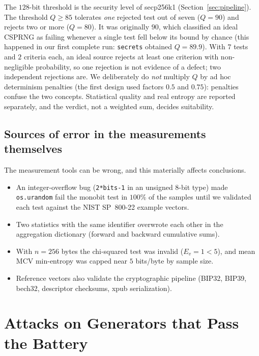 \documentclass[11pt,a4paper]{article}
\theoremstyle{plain}
\theoremstyle{definition}
\begin{document}
The $128$-bit threshold is the security level of secp256k1 (Section~\ref{sec:pipeline}).
The threshold $Q\ge85$ tolerates \emph{one} rejected test out of seven ($Q=90$)
and rejects two or more ($Q=80$). It was originally $90$, which classified an
ideal CSPRNG as failing whenever a single test fell below its bound by chance
(this happened in our first complete run: \texttt{secrets} obtained $Q=89.9$).
With $7$ tests and $2$ criteria each, an ideal source rejects at least one
criterion with non-negligible probability, so one rejection is not evidence of
a defect; two independent rejections are.
We deliberately do \emph{not} multiply $Q$ by ad hoc determinism penalties
(the first design used factors $0.5$ and $0.75$): penalties confuse the two
concepts. Statistical quality and real entropy are reported separately, and the
verdict, not a weighted sum, decides suitability.

\subsection{Sources of error in the measurements themselves}

The measurement tools can be wrong, and this materially affects conclusions.
\begin{itemize}[leftmargin=1.4em]
    \item An integer-overflow bug (\texttt{2*bits-1} in an unsigned 8-bit type)
          made \texttt{os.urandom} fail the monobit test in $100\%$ of the samples
          until we validated each test against the NIST SP~800-22 example
          vectors.
    \item Two statistics with the same identifier overwrote each other in the
          aggregation dictionary (forward and backward cumulative sums).
    \item With $n=256$ bytes the chi-squared test was invalid ($E_v=1<5$), and
          mean MCV min-entropy was capped near $5$ bits/byte by sample size.
    \item Reference vectors also validate the cryptographic pipeline (BIP32,
          BIP39, bech32, descriptor checksums, xpub serialization).
\end{itemize}

\section{Attacks on Generators that Pass the Battery}\label{sec:attacks}
\end{document}
